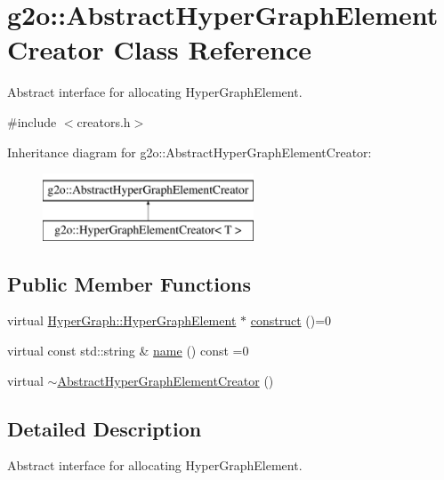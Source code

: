 \hypertarget{classg2o_1_1_abstract_hyper_graph_element_creator}{}\section{g2o\+:\+:Abstract\+Hyper\+Graph\+Element\+Creator Class Reference}
\label{classg2o_1_1_abstract_hyper_graph_element_creator}


Abstract interface for allocating Hyper\+Graph\+Element.  




{\ttfamily \#include $<$creators.\+h$>$}

Inheritance diagram for g2o\+:\+:Abstract\+Hyper\+Graph\+Element\+Creator\+:\begin{figure}[H]
\begin{center}
\leavevmode
\includegraphics[height=2.000000cm]{classg2o_1_1_abstract_hyper_graph_element_creator}
\end{center}
\end{figure}
\subsection*{Public Member Functions}
\begin{DoxyCompactItemize}
\item 
virtual \mbox{\hyperlink{structg2o_1_1_hyper_graph_1_1_hyper_graph_element}{Hyper\+Graph\+::\+Hyper\+Graph\+Element}} $\ast$ \mbox{\hyperlink{classg2o_1_1_abstract_hyper_graph_element_creator_a0b4722fa4b05465bf89d6e7fdc75b153}{construct}} ()=0
\item 
virtual const std\+::string \& \mbox{\hyperlink{classg2o_1_1_abstract_hyper_graph_element_creator_a238928fbbfd6e473b2c61002112e6f5f}{name}} () const =0
\item 
virtual \mbox{\hyperlink{classg2o_1_1_abstract_hyper_graph_element_creator_a7739f2b8d9e10f71c31d41748cf10835}{$\sim$\+Abstract\+Hyper\+Graph\+Element\+Creator}} ()
\end{DoxyCompactItemize}


\subsection{Detailed Description}
Abstract interface for allocating Hyper\+Graph\+Element. 

